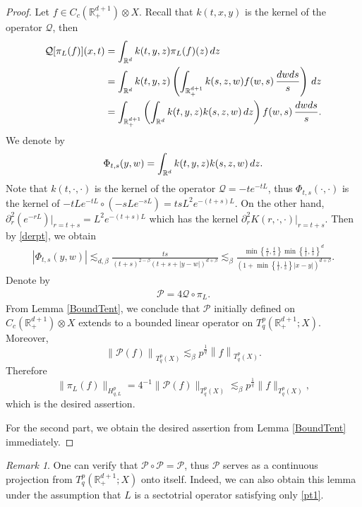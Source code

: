 \documentclass[oneside,english,a4wide]{amsart}
\numberwithin{equation}{section}
\numberwithin{figure}{section}
\theoremstyle{plain}
\theoremstyle{plain}
\theoremstyle{definition}
\theoremstyle{plain}
\theoremstyle{remark}
\theoremstyle{definition}
\theoremstyle{remark}
\newtheorem{remark}[thm]{Remark}
\theoremstyle{definition}
\newcommand{\real}{{\mathbb R}}
\newcommand{\Q}{{\mathcal Q}}
\newcommand{\8}{+\infty}
\renewcommand{\1}{\mathbbm{1}}
\newcommand\norm[1]{ \left\| #1 \right\| }
\newcommand\sk[1]{ \left( #1 \right) }
\newcommand\lk[1]{ \left\{ #1 \right\} }
\renewcommand\d{{\rm d}}
\begin{document}
{\begin{proof}
Let $f\in C_c(\real^{d+1}_+)\otimes X$. Recall that $k(t, x, y)$ is the kernel of the operator $\Q$, then
\begin{equation}
\begin{split}
    \Q[\pi_L(f)](x, t) & = \int_{\real^d} k(t, y, z)\pi_L(f)(z) \,\d z  \\
    & = \int_{\real^d} k(t, y, z) \sk{ \int_{\real^{d+1}_+} k(s, z, w)f(w, s) \,\frac{\d w\d s}{s} } \,\d z  \\
    & = \int_{\real^{d+1}_+} \sk{ \int_{\real^d} k(t, y, z) k(s, z, w) \, \d z }f(w, s) \,\frac{\d w\d s}{s}.
\end{split}
\end{equation}
We denote by
\[
    \Phi_{t, s}(y, w) = \int_{\real^d} k(t, y, z) k(s, z, w) \, \d z. 
\]
Note that $k(t, \cdot, \cdot)$ is the kernel of the operator $\Q=-te^{-tL}$, thus $\Phi_{t,s}(\cdot,\cdot)$ is the kernel of $-tLe^{-tL}\circ(-sLe^{-sL})=tsL^2e^{-(t+s)L}$. On the other hand, $\partial^2_r (e^{-rL})|_{r=t+s}=L^2e^{-(t+s)L}$ which has the kernel $\partial^2_r K(r,\cdot,\cdot)|_{r=t+s}$. Then by \eqref{derpt}, we obtain 
\begin{align*}
    |\Phi_{t, s}(y, w)| \lesssim_{d, \beta} \frac{ts}{(t+s)^{2-\beta}(t+s+|y - w|)^{d+ \beta} }  \lesssim_{\beta} \frac{ \min\lk{\frac{s}{t},  \frac{t}{s}} \min\lk{ \frac{1}{t}, \frac{1}{s} }^d }{\sk{ 1 + \min\lk{ \frac{1}{t}, \frac{1}{s} }|x - y| }^{d + \beta}  }.
\end{align*}
Denote by 
\begin{align}\label{Proj}
    \mathcal{P} = 4 \mathcal Q \circ \pi_L. 
\end{align}
 From Lemma \ref{BoundTent}, we conclude that $\mathcal{P}$ initially defined on $C_c(\real^{d+1}_+)\otimes X$ extends to a bounded linear operator on $T^p_q(\real^{d+1}_+; X)$. Moreover,
\[
    \norm{  \mathcal{P}(f) }_{T^p_q(X)} \lesssim_{\beta} p^{\frac{1}{q}}\norm{ f}_{T^p_q(X)}.
\]
Therefore
\[
    \| \pi_L(f) \|_{H^p_{q, L}} = 4^{-1}\| \mathcal{P}(f) \|_{T^p_{q}(X)} \lesssim_{\beta} p^{\frac{1}{q}}\| 
    f \|_{T^p_q(X)},
\]
which is the desired assertion.

For the second part, we obtain the desired assertion from Lemma \ref{BoundTent} immediately.
\end{proof}

\begin{remark}\label{extend:PiL}
    One can verify that $\mathcal{P} \circ \mathcal{P} = \mathcal{P}$, thus $\mathcal{P}$ serves as a continuous projection from $T^p_q\sk{\real^{d+1}_+; X}$ onto itself. Indeed, we can also obtain this lemma under the assumption that $L$ is a sectotrial operator satisfying only \eqref{pt1}.
\end{remark}

}
\end{document}
